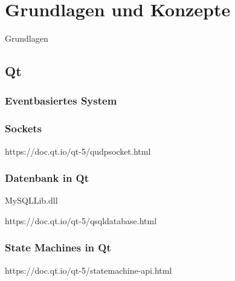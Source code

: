 
\chapter{Grundlagen und Konzepte}
\label{sec:Grundlagen}

Grundlagen

\section{Qt}

\subsection{Eventbasiertes System}
\label{sec:Eventbasiert}

\subsection{Sockets}
\label{sec:QTSocket}
https://doc.qt.io/qt-5/qudpsocket.html
\cite{qt_socket}

\subsection{Datenbank in Qt}
\label{sec:QTDatabase}
MySQLLib.dll

https://doc.qt.io/qt-5/qsqldatabase.html
\cite{qt_database}

\subsection{State Machines in Qt}
\label{sec:StateMachines}
https://doc.qt.io/qt-5/statemachine-api.html

\cite{qt_statemachine}